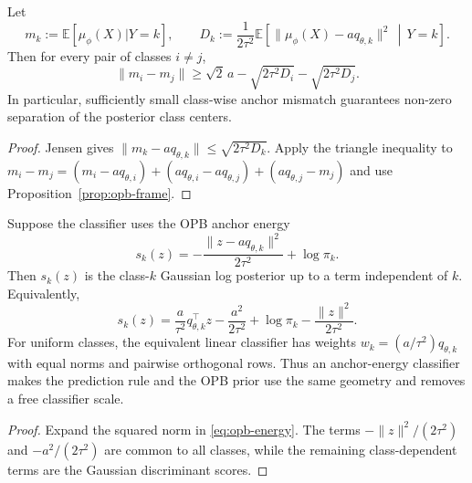 \begin{proposition}
\label{prop:opb-separation}
Let
\begin{equation}
m_k := \mathbb{E}[\mu_\phi(X)|Y=k],
\qquad
D_k := \frac{1}{2\tau^2}
\mathbb{E}\left[
\|\mu_\phi(X)-a q_{\theta,k}\|^2\,\middle|\,Y=k
\right].
\label{eq:opb-class-rate}
\end{equation}
Then for every pair of classes $i\ne j$,
\begin{equation}
\|m_i-m_j\|
\ge \sqrt{2}\,a
-\sqrt{2\tau^2D_i}
-\sqrt{2\tau^2D_j}.
\label{eq:opb-separation}
\end{equation}
In particular, sufficiently small class-wise anchor mismatch guarantees non-zero
separation of the posterior class centers.
\end{proposition}

\begin{proof}
Jensen gives
$\|m_k-aq_{\theta,k}\|\le\sqrt{2\tau^2D_k}$. Apply the triangle inequality to
$m_i-m_j=(m_i-aq_{\theta,i})+(aq_{\theta,i}-aq_{\theta,j})
+(aq_{\theta,j}-m_j)$ and use Proposition~\ref{prop:opb-frame}.
\end{proof}

\begin{proposition}
\label{prop:opb-energy}
Suppose the classifier uses the OPB anchor energy
\begin{equation}
s_k(z) = -\frac{\|z-aq_{\theta,k}\|^2}{2\tau^2}+\log\pi_k.
\label{eq:opb-energy}
\end{equation}
Then $s_k(z)$ is the class-$k$ Gaussian log posterior up to a term independent of
$k$. Equivalently,
\begin{equation}
s_k(z) = \frac{a}{\tau^2}q_{\theta,k}^{\top}z
-\frac{a^2}{2\tau^2}+\log\pi_k
-\frac{\|z\|^2}{2\tau^2}.
\label{eq:opb-energy-linear}
\end{equation}
For uniform classes, the equivalent linear classifier has weights
$w_k=(a/\tau^2)q_{\theta,k}$ with equal norms and pairwise orthogonal rows.
Thus an anchor-energy classifier makes the prediction rule and the OPB prior use
the same geometry and removes a free classifier scale.
\end{proposition}

\begin{proof}
Expand the squared norm in \eqref{eq:opb-energy}. The terms
$-\|z\|^2/(2\tau^2)$ and $-a^2/(2\tau^2)$ are common to all classes, while the
remaining class-dependent terms are the Gaussian discriminant scores.
\end{proof}

